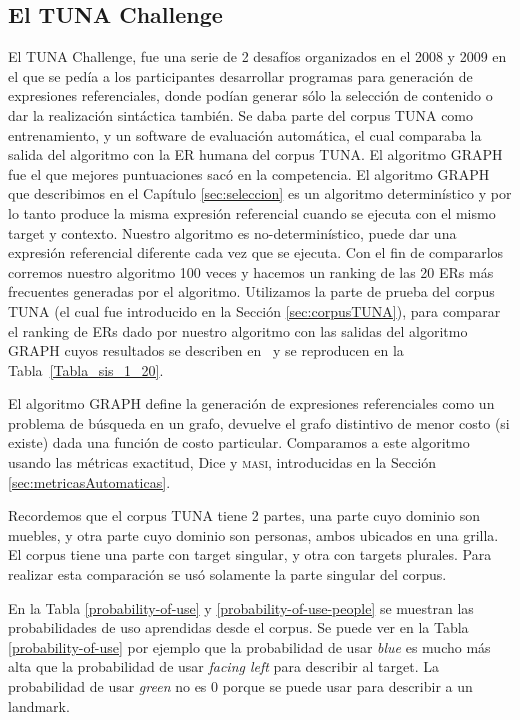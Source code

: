 \subsection{El TUNA Challenge}
El TUNA Challenge, fue una serie de 2 desaf\'ios organizados en el 2008 y 2009 en el que se ped\'ia a los participantes desarrollar programas para generaci\'on de expresiones referenciales, donde pod\'ian generar s\'olo la selecci\'on de contenido o dar la realizaci\'on sint\'actica tambi\'en.
Se daba parte del corpus TUNA como entrenamiento, y un software de evaluaci\'on autom\'atica, el cual comparaba la salida del algoritmo con la ER humana del corpus TUNA. El algoritmo GRAPH fue el que mejores puntuaciones sac\'o en la competencia.
El algoritmo GRAPH que describimos en el Cap\'itulo \ref{sec:seleccion} es un algoritmo determin\'istico y por lo tanto produce la misma expresi\'on referencial cuando se ejecuta con el mismo target y contexto. Nuestro algoritmo es no-determin\'istico, puede dar una expresi\'on referencial diferente cada vez que se ejecuta. Con el fin de compararlos corremos nuestro algoritmo 100 veces y hacemos un ranking de las 20 ERs m\'as frecuentes generadas por el algoritmo. Utilizamos la parte de prueba del corpus TUNA (el cual fue introducido en la Secci\'on \ref{sec:corpusTUNA}), para comparar el ranking de ERs dado por nuestro algoritmo con las salidas del algoritmo GRAPH cuyos resultados se describen en~\cite{KrahmerGRAPH} y se reproducen en la Tabla~\ref{Tabla_sis_1_20}.


El algoritmo GRAPH define la generaci\'on de expresiones referenciales como un problema de b\'usqueda en un grafo, devuelve el grafo distintivo de menor costo (si existe) dada una funci\'on de costo particular. Comparamos a este algoritmo usando las m\'etricas exactitud, Dice y \textsc {masi}, introducidas en la Secci\'on \ref{sec:metricasAutomaticas}. 

Recordemos que el corpus TUNA tiene 2 partes, una parte cuyo dominio son muebles, y otra parte cuyo dominio son personas, ambos ubicados en una grilla. El corpus tiene una parte con target singular, y otra con targets plurales. Para realizar esta comparaci\'on se us\'o solamente la parte singular del corpus.


En la Tabla \ref{probability-of-use} y \ref{probability-of-use-people} se muestran las probabilidades de uso aprendidas desde el corpus. Se puede ver en la Tabla \ref{probability-of-use} por ejemplo que la probabilidad de usar {\it blue} es mucho m\'as alta que la probabilidad de usar {\it facing left} para describir al target. La probabilidad de usar {\it green} no es 0 porque se puede usar para describir a un landmark.

